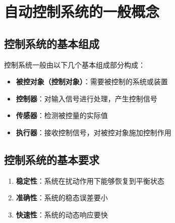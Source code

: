 \section{自动控制系统的一般概念}

\subsection{控制系统的基本组成}
控制系统一般由以下几个基本组成部分构成：
\begin{itemize}
    \item \textbf{被控对象（控制对象）}：需要被控制的系统或装置
    \item \textbf{控制器}：对输入信号进行处理，产生控制信号
    \item \textbf{传感器}：检测被控量的实际值
    \item \textbf{执行器}：接收控制信号，对被控对象施加控制作用
\end{itemize}

\subsection{控制系统的基本要求}
\begin{enumerate}
    \item \textbf{稳定性}：系统在扰动作用下能够恢复到平衡状态
    \item \textbf{准确性}：系统的稳态误差要小
    \item \textbf{快速性}：系统的动态响应要快
\end{enumerate}

